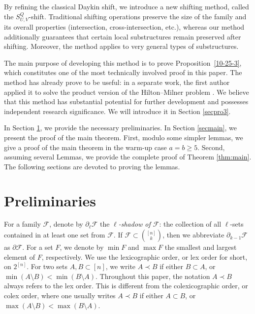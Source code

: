 \documentclass[11pt]{article}
\newcommand{\m}{\mathcal}
\begin{document}
By refining the classical Daykin shift, we introduce a new shifting method, called the $S_{U,V}^Q$-shift. Traditional shifting operations preserve the size of the family and its overall properties (intersection, cross-intersection, etc.), whereas our method additionally guarantees that certain local substructures remain preserved after shifting. Moreover, the method applies to very general types of substructures. 

The main purpose of developing this method is to prove Proposition~\ref{10-25-3}, which constitutes one of the most technically involved proof in this paper. The method has already prove to be useful: in a separate work, the first author applied it  to solve the product version of the Hilton--Milner problem \cite{huang-product}. We believe that this method has substantial potential for further development and possesses independent research significance. We will introduce it in Section \ref{secpro3}.

In Section \ref{secpre}, we provide the necessary preliminaries.
In Section \ref{secmain}, we present the proof of the main theorem. First, modulo some simpler lemmas, we give a proof of the main theorem in the warm-up case $a=b\ge 5$. Second, assuming several Lemmas, we provide the complete proof of Theorem \ref{thm:main}.
The following sections are devoted to proving the lemmas. %





\section{Preliminaries}\label{secpre}

For a family $\mathcal{F}$, denote by $\partial_{\ell}\mathcal{F}$ the {\it $\ell$-shadow of $\m F$}: the collection of all $\ell$-sets contained in at least one set from $\mathcal{F}$. If $\mathcal{F} \subset {[n]\choose k}$,
then we abbreviate $\partial_{k-1}\mathcal{F}$ as $\partial \mathcal{F}$.
For a set $F$, we denote by $\min F$ and $\max F$ the smallest and largest element of $F$, respectively.
We use the lexicographic order, or lex order for short, on $2^{[n]}$.
For two sets $A,B\subset [n]$, we write $A\prec B$ if either
$B\subset A$, or $\min(A\setminus B)<\min(B\setminus A)$.
Throughout this paper, the notation $A\prec B$ always refers to
the lex order. This is different from the colexicographic order,
or colex order, where one usually writes $A\prec B$ if either
$A\subset B$, or $\max(A\setminus B)<\max(B\setminus A)$.
\end{document}
